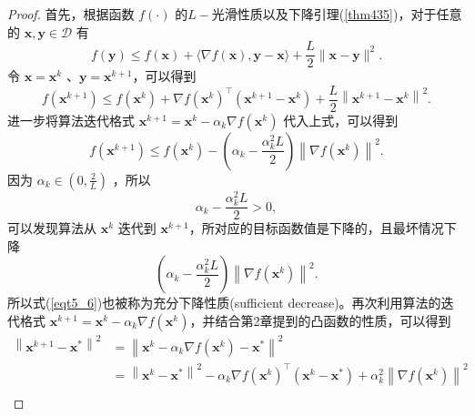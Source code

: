 \begin{proof}
    
    首先，根据函数 $f(\cdot)$ 的$L-$光滑性质以及下降引理(\ref{thm435})，对于任意的 $\bm{x}, \bm{y} \in   \mathcal{D}$ 有
    \begin{equation}
        f(\bm{y}) \leq f(\bm{x})+\langle\nabla f(\bm{x}), \bm{y}-\bm{x}\rangle+\frac{L}{2}\|\bm{x}-\bm{y}\|^{2} .
        \nonumber 
    \end{equation}
    令 $\bm{x}=\bm{x}^{k}$ 、$\bm{y}=\bm{x}^{k+1}$，可以得到
    \begin{equation}
        f\left(\bm{x}^{k+1}\right) \leq f\left(\bm{x}^{k}\right)+\nabla f\left(\bm{x}^{k}\right)^{\top}\left(\bm{x}^{k+1}-\bm{x}^{k}\right)+\frac{L}{2}\left\|\bm{x}^{k+1}-\bm{x}^{k}\right\|^{2} .
        \nonumber
    \end{equation}
    进一步将算法迭代格式 $\bm{x}^{k+1}=\bm{x}^{k}-\alpha_{k} \nabla f\left(\bm{x}^{k}\right)$ 代入上式，可以得到
    \begin{equation}
        f\left(\bm{x}^{k+1}\right) \leq f\left(\bm{x}^{k}\right)-\left(\alpha_{k}-\frac{\alpha_{k}^{2} L}{2}\right)\left\|\nabla f\left(\bm{x}^{k}\right)\right\|^{2} .
        \label{eqt5_6}
    \end{equation}
    因为 $\alpha_{k} \in\left(0, \frac{2}{L}\right)$ ，所以
    \begin{equation}
        \alpha_{k}-\frac{\alpha_{k}^{2} L}{2}>0,
        \label{eqt107}
    \end{equation}
    可以发现算法从 $\bm{x}^{k}$ 迭代到 $\bm{x}^{k+1}$，所对应的目标函数值是下降的，且最坏情况下降
    \begin{equation}
        \left(\alpha_{k}-\frac{\alpha_{k}^{2} L}{2}\right)\left\|\nabla f\left(\bm{x}^{k}\right)\right\|^{2} .
        \nonumber
    \end{equation}
    所以式(\ref{eqt5_6})也被称为充分下降性质(sufficient decrease)\cite{2009Accelerated}。再次利用算法的迭代格式 $\bm{x}^{k+1}=\bm{x}^{k}-\alpha_{k} \nabla f\left(\bm{x}^{k}\right)$，并结合第2章提到的凸函数的性质，可以得到
    \begin{equation}
        \begin{split}
        \left\|\bm{x}^{k+1}-\bm{x}^{*}\right\|^{2} &=\left\|\bm{x}^{k}-\alpha_{k} \nabla f\left(\bm{x}^{k}\right)-\bm{x}^{*}\right\|^{2} \\
        &=\left\|\bm{x}^{k}-\bm{x}^{*}\right\|^{2}-\alpha_{k} \nabla f\left(\bm{x}^{k}\right)^{\top}\left(\bm{x}^{k}-\bm{x}^{*}\right)+\alpha_{k}^{2}\left\|\nabla f\left(\bm{x}^{k}\right)\right\|^{2} \\

\end{split}
\end{equation}
\end{proof}
